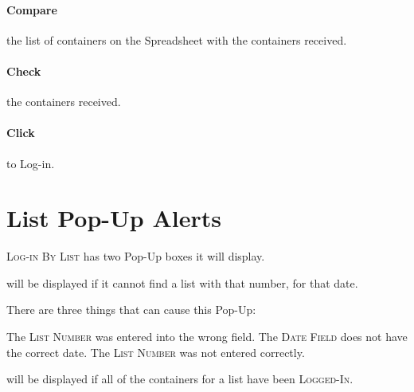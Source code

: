 
\paragraph{Compare} the list of containers on the Spreadsheet with the containers received.

\paragraph{Check \faCheckSquareO} the containers received.

\paragraph{Click}  to Log-in.

\section{List Pop-Up Alerts}
\textsc{Log-in By List} has two Pop-Up boxes it will display.

 will be displayed if it cannot find a list with that number, for that date.\\


 There are three things that can cause this Pop-Up:
\begin{description}
     The \textsc{List Number} was entered into the wrong field.
     The \textsc{Date Field} does not have the correct date.
     The \textsc{List Number} was not entered correctly.
\end{description}


 will be displayed if all of the containers for a list have been \textsc{Logged-In}.\\

